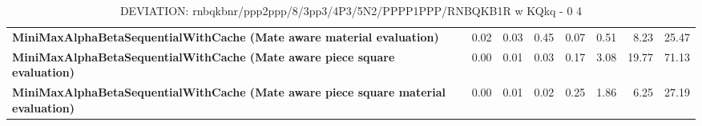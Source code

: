 \begin{table}[H]
{\begin{tabular}{|p{8cm}|*{7}{r|}}
            \rowcolor[HTML]{EFEFEF}
            \textbf{MiniMaxAlphaBetaSequentialWithCache (Mate aware material evaluation)}              & 0.02 & 0.03 & 0.45 & 0.07 & 0.51 & 8.23 & 25.47 \\
            \rowcolor[HTML]{FFFFFF}
            \textbf{MiniMaxAlphaBetaSequentialWithCache (Mate aware piece square evaluation)}               & 0.00 & 0.01 & 0.03 & 0.17 & 3.08 & 19.77 & 71.13 \\
            \rowcolor[HTML]{EFEFEF}
            \textbf{MiniMaxAlphaBetaSequentialWithCache (Mate aware piece square material evaluation)}               & 0.00 & 0.01 & 0.02 & 0.25 & 1.86 & 6.25 & 27.19 \\

            \hline
        \end{tabular}%
    }
    \caption{DEVIATION: rnbqkbnr/ppp2ppp/8/3pp3/4P3/5N2/PPPP1PPP/RNBQKB1R w KQkq - 0 4}
    \label{tab:simple-tactical-position-deviation}
\end{table}

